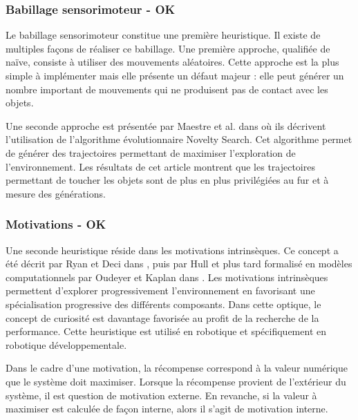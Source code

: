 \documentclass[draft]{llncs}
\begin{document}
\subsubsection{Babillage sensorimoteur - OK}

Le babillage sensorimoteur constitue une première heuristique.
Il existe de multiples façons de réaliser ce babillage.
Une première approche, qualifiée de naïve, consiste à utiliser des mouvements aléatoires.
Cette approche est la plus simple à implémenter mais elle présente un défaut majeur : elle peut générer un nombre important de mouvements qui ne produisent pas de contact avec les objets.

Une seconde approche est présentée par Maestre et al. dans \cite{Maestre2015} où ils décrivent l'utilisation de l'algorithme évolutionnaire Novelty Search.
Cet algorithme permet de générer des trajectoires permettant de maximiser l'exploration de l'environnement.
Les résultats de cet article montrent que les trajectoires permettant de toucher les objets sont de plus en plus privilégiées au fur et à mesure des générations.




\subsubsection{Motivations - OK}

Une seconde heuristique réside dans les motivations intrinsèques.
Ce concept a été décrit par Ryan et Deci dans \cite{Ryan2000}, puis par Hull et plus tard formalisé en modèles computationnels par Oudeyer et Kaplan dans \cite{10.3389/neuro.12.006.2007}.
Les motivations intrinsèques permettent d'explorer progressivement l'environnement en favorisant une spécialisation progressive des différents composants.
Dans cette optique, le concept de curiosité est davantage favorisée au profit de la recherche de la performance.
Cette heuristique est utilisé en robotique et spécifiquement en robotique développementale.



Dans le cadre d'une motivation, la récompense correspond à la valeur numérique que le système doit maximiser.
Lorsque la récompense provient de l'extérieur du système, il est question de motivation externe.
En revanche, si la valeur à maximiser est calculée de façon interne, alors il s'agit de motivation interne.

\end{document}
